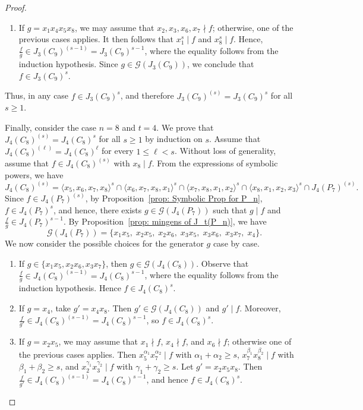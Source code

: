 \documentclass[12pt]{amsart}
\def\l{\langle}
\def\r{\rangle}
\begin{document}
\begin{proof}
\begin{enumerate}
\item If $g=x_1x_4x_5x_8$, we may assume that $x_2,x_3, x_6,x_7\nmid f$; otherwise, one of the previous cases applies. It then follows that $x_1^s\mid f$ and $x_8^s\mid f$. Hence, $\frac{f}{g}\in J_3(C_9)^{(s-1)}=J_3(C_9)^{s-1}$, where the equality follows from the induction hypothesis.
Since $g\in \mathcal{G}(J_3(C_9))$, we conclude that
$f\in J_3(C_9)^s$.

\end{enumerate}
Thus, in any case $f\in J_3(C_9)^s$, and therefore $J_3(C_9)^{(s)} = J_3(C_9)^s$ for all $s\ge1$.

Finally, consider the case $n=8$ and $t=4$. We prove that
$J_4(C_8)^{(s)} = J_4(C_8)^s$ for all $s \ge 1$ by induction on $s$. Assume that $J_4(C_8)^{(\ell)} = J_4(C_8)^{\ell}$ for every $1\le \ell < s$. Without loss of generality, assume that $f \in J_4(C_8)^{(s)}$ with $x_8 \mid f$. From the expressions of symbolic powers, we have
\[
J_4(C_8)^{(s)}= \l x_5,x_6,x_7,x_8\r ^s
\cap \l x_6,x_7,x_8,x_1\r ^s
\cap \l x_7,x_8,x_1,x_2\r ^s
\cap \l x_8,x_1,x_2,x_3\r ^s
\cap J_4(P_7)^{(s)}.
\]
Since $f \in J_4(P_7)^{(s)}$, by Proposition~\ref{prop: Symbolic Prop for P_n}, $f \in J_4(P_7)^{s}$, and hence, there exists $g \in \mathcal{G}(J_4(P_7))$ such that $g \mid f$ and $\frac{f}{g} \in J_4(P_7)^{s-1}$. By Proposition~\ref{prop: mingens of J_t(P_n)}, we have 
\[
\mathcal{G}(J_4(P_7))=\{x_1x_5,\; x_2x_5,\; x_2x_6,\; x_3x_5,\; x_3x_6,\; x_3x_7,\; x_4\}.
\]
We now consider the possible choices for the generator $g$ case by case.
\begin{enumerate}


\item If $g \in \{x_1x_5, x_2x_6, x_3x_7\}$, then
$g \in \mathcal{G}(J_4(C_8))$. Observe that $\frac{f}{g} \in J_4(C_8)^{(s-1)} = J_4(C_8)^{s-1}$, where the equality follows from the induction hypothesis. Hence $f \in J_4(C_8)^s$.

\item If $g = x_4$, take $g' = x_4x_8$.
Then $g' \in \mathcal{G}(J_4(C_8))$ and $g' \mid f$.
Moreover, $\frac{f}{g'} \in J_4(C_8)^{(s-1)} = J_4(C_8)^{s-1}$,
so $f \in J_4(C_8)^s$.

\item If $g = x_2x_5$, we may assume that
$x_1 \nmid f$, $x_4 \nmid f$, and $x_6 \nmid f$;
otherwise one of the previous cases applies.
Then $x_5^{\alpha_1}x_7^{\alpha_2} \mid f$ with $\alpha_1+\alpha_2 \ge s$,
$x_7^{\beta_1}x_8^{\beta_2} \mid f$ with $\beta_1+\beta_2 \ge s$,
and $x_2^{\gamma_1}x_3^{\gamma_2} \mid f$ with $\gamma_1+\gamma_2 \ge s$.
Let $g' = x_2x_5x_8$. Then
$\frac{f}{g'} \in J_4(C_8)^{(s-1)} = J_4(C_8)^{s-1}$,
and hence $f \in J_4(C_8)^s$.


\end{enumerate}
\end{proof}
\end{document}
